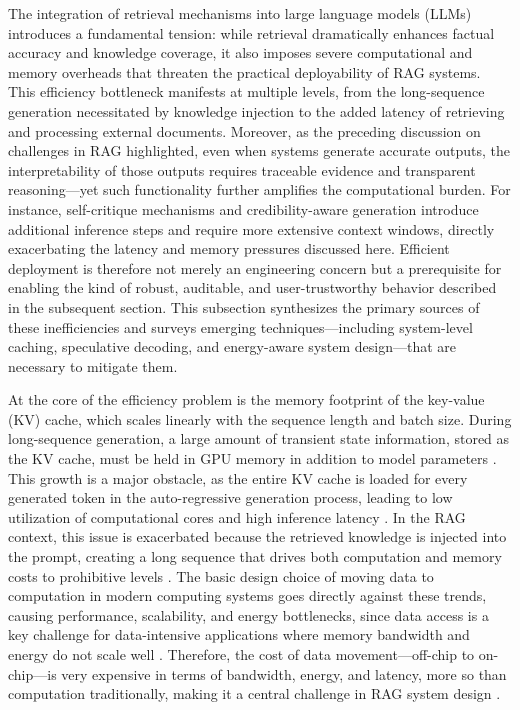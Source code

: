 \documentclass[11pt]{article}
\begin{document}
The integration of retrieval mechanisms into large language models (LLMs) introduces a fundamental tension: while retrieval dramatically enhances factual accuracy and knowledge coverage, it also imposes severe computational and memory overheads that threaten the practical deployability of RAG systems. This efficiency bottleneck manifests at multiple levels, from the long-sequence generation necessitated by knowledge injection to the added latency of retrieving and processing external documents. Moreover, as the preceding discussion on challenges in RAG highlighted, even when systems generate accurate outputs, the interpretability of those outputs requires traceable evidence and transparent reasoning---yet such functionality further amplifies the computational burden. For instance, self-critique mechanisms and credibility-aware generation introduce additional inference steps and require more extensive context windows, directly exacerbating the latency and memory pressures discussed here. Efficient deployment is therefore not merely an engineering concern but a prerequisite for enabling the kind of robust, auditable, and user-trustworthy behavior described in the subsequent section. This subsection synthesizes the primary sources of these inefficiencies and surveys emerging techniques---including system-level caching, speculative decoding, and energy-aware system design---that are necessary to mitigate them.

At the core of the efficiency problem is the memory footprint of the key-value (KV) cache, which scales linearly with the sequence length and batch size. During long-sequence generation, a large amount of transient state information, stored as the KV cache, must be held in GPU memory in addition to model parameters \cite{ref226}. This growth is a major obstacle, as the entire KV cache is loaded for every generated token in the auto-regressive generation process, leading to low utilization of computational cores and high inference latency \cite{ref227}. In the RAG context, this issue is exacerbated because the retrieved knowledge is injected into the prompt, creating a long sequence that drives both computation and memory costs to prohibitive levels \cite{ref58}. The basic design choice of moving data to computation in modern computing systems goes directly against these trends, causing performance, scalability, and energy bottlenecks, since data access is a key challenge for data-intensive applications where memory bandwidth and energy do not scale well \cite{ref228,ref229}. Therefore, the cost of data movement---off-chip to on-chip---is very expensive in terms of bandwidth, energy, and latency, more so than computation traditionally, making it a central challenge in RAG system design \cite{ref230}.
\end{document}
